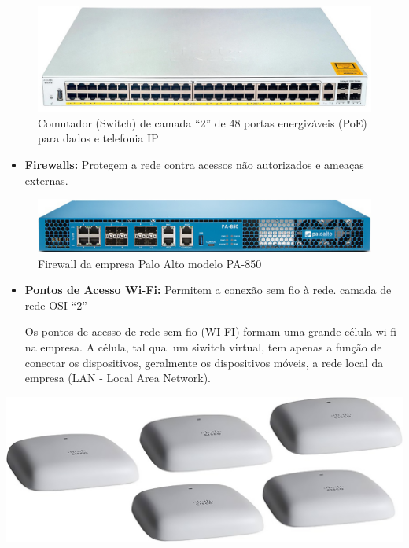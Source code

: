 \documentclass[
]{book}
\providecommand{\tightlist}{%
  \setlength{\itemsep}{0pt}\setlength{\parskip}{0pt}}
\begin{document}
\begin{figure}
\centering
\includegraphics{images/InfraEstrutura/Redes/switch-cisco-3750x-48.jpg}
\caption{Comutador (Switch) de camada ``2'' de 48 portas energizáveis (PoE) para dados e telefonia IP}
\end{figure}

\begin{itemize}
\tightlist
\item
  \textbf{Firewalls:} Protegem a rede contra acessos não autorizados e ameaças externas.
\end{itemize}

\begin{figure}
\centering
\includegraphics{images/InfraEstrutura/Redes/firewall-PaloAlto-PA850.jpg}
\caption{Firewall da empresa Palo Alto modelo PA-850}
\end{figure}

\begin{itemize}
\item
  \textbf{Pontos de Acesso Wi-Fi:} Permitem a conexão sem fio à rede. camada de rede OSI ``2''

  Os pontos de acesso de rede sem fio (WI-FI) formam uma grande célula wi-fi na empresa. A célula, tal qual um siwitch virtual, tem apenas a função de conectar os dispositivos, geralmente os dispositivos móveis, a rede local da empresa (LAN - Local Area Network).
\end{itemize}

\href{Pontos\%20de\%20Acesso\%20CISCO}{\includegraphics{images/InfraEstrutura/Redes/Ponto_De_Acesso-cisco.jpg}}
\end{document}
